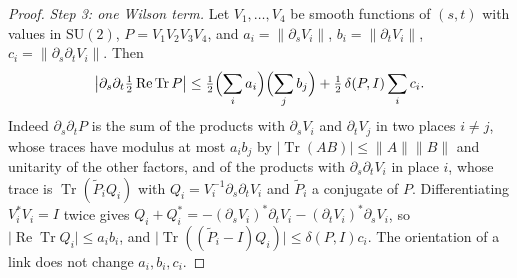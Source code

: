 \documentclass[11pt]{amsart}
\theoremstyle{definition}
\theoremstyle{remark}
\numberwithin{equation}{section}
\newcommand{\SU}{\mathrm{SU}}
\newcommand{\Tr}{\operatorname{Tr}}
\newcommand{\ReTr}{\operatorname{Re}\operatorname{Tr}}
\begin{document}
\begin{proof}
\emph{Step 3: one Wilson term.} Let $V_1,\dots,V_4$ be smooth functions
of $(s,t)$ with values in $\SU(2)$, $P=V_1V_2V_3V_4$, and
$a_i=\lVert\partial_sV_i\rVert$, $b_i=\lVert\partial_tV_i\rVert$,
$c_i=\lVert\partial_s\partial_tV_i\rVert$. Then
\begin{equation}\label{eq:wilsonmixed}
\bigl\lvert\partial_s\partial_t\tfrac12\ReTr P\bigr\rvert\le\tfrac12
\Bigl(\sum_ia_i\Bigr)\Bigl(\sum_jb_j\Bigr)+\tfrac12\,\delta(P,I)
\sum_ic_i .
\end{equation}
Indeed $\partial_s\partial_tP$ is the sum of the products with
$\partial_sV_i$ and $\partial_tV_j$ in two places $i\ne j$, whose traces
have modulus at most $a_ib_j$ by $\lvert\Tr(AB)\rvert\le\lVert A\rVert
\lVert B\rVert$ and unitarity of the other factors, and of the products
with $\partial_s\partial_tV_i$ in place $i$, whose trace is
$\Tr(\tilde P_iQ_i)$ with $Q_i=V_i^{-1}\partial_s\partial_tV_i$ and
$\tilde P_i$ a conjugate of $P$. Differentiating $V_i^*V_i=I$ twice gives
$Q_i+Q_i^*=-(\partial_sV_i)^*\partial_tV_i-(\partial_tV_i)^*\partial_sV_i$,
so $\lvert\ReTr Q_i\rvert\le a_ib_i$, and $\lvert\Tr((\tilde P_i-I)Q_i)
\rvert\le\delta(P,I)c_i$. The orientation of a link does not change
$a_i,b_i,c_i$.


\end{proof}
\end{document}
